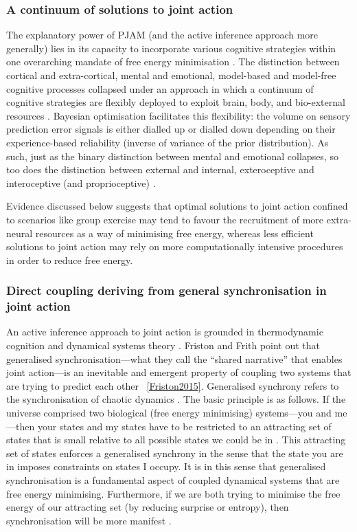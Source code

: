 \begin{CJK}{UTF8}{gbsn}
\subsubsection{A continuum of solutions to joint action}

The explanatory power of PJAM (and the active inference approach more generally) lies in its capacity to incorporate various cognitive strategies within one overarching mandate of free energy minimisation \citep{Clark2015}.  The distinction between cortical and extra-cortical, mental and emotional, model-based and model-free cognitive processes collapsed under an approach in which a continuum of cognitive strategies are flexibly deployed to exploit brain, body, and bio-external resources \citep{Pezzulo2013}.  Bayesian optimisation facilitates this flexibility: the volume on sensory prediction error signals is either dialled up or dialled down depending on their experience-based reliability (inverse of variance of the prior distribution).  As such, just as the binary distinction between mental and emotional collapses, so too does the distinction between external and internal, exteroceptive and interoceptive (and proprioceptive) \citep{Seth2013}.

Evidence discussed below suggests that optimal solutions to joint action confined to scenarios like group exercise may tend to favour the recruitment of more extra-neural resources as a way of minimising free energy, whereas less efficient solutions to joint action may rely on more computationally intensive procedures in order to reduce free energy.

\subsubsection{Direct coupling deriving from general synchronisation in joint action}

An active inference approach to joint action is grounded in thermodynamic cognition and dynamical systems theory \citep{Friston2013}.  Friston and Frith point out that generalised synchronisation---what they call the ``shared narrative'' that enables joint action---is an inevitable and emergent property of coupling two systems that are trying to predict each other ~\ref{Friston2015}.  Generalised synchrony refers to the synchronisation of chaotic dynamics \citep{Barreto2004}.  The basic principle is as follows.  If the universe comprised two biological (free energy minimising) systems---you and me---then your states and my states have to be restricted to an attracting set of states that is small relative to all possible states we could be in \citep{Friston2015}.  This attracting set of states enforces a generalised synchrony in the sense that the state you are in imposes constraints on states I occupy.  It is in this sense that generalised synchronisation is a fundamental aspect of coupled dynamical systems that are free energy minimising.  Furthermore, if we are both trying to minimise the free energy of our attracting set (by reducing surprise or entropy), then synchronisation will be more manifest \citep{Friston2015a}.


\end{CJK}
